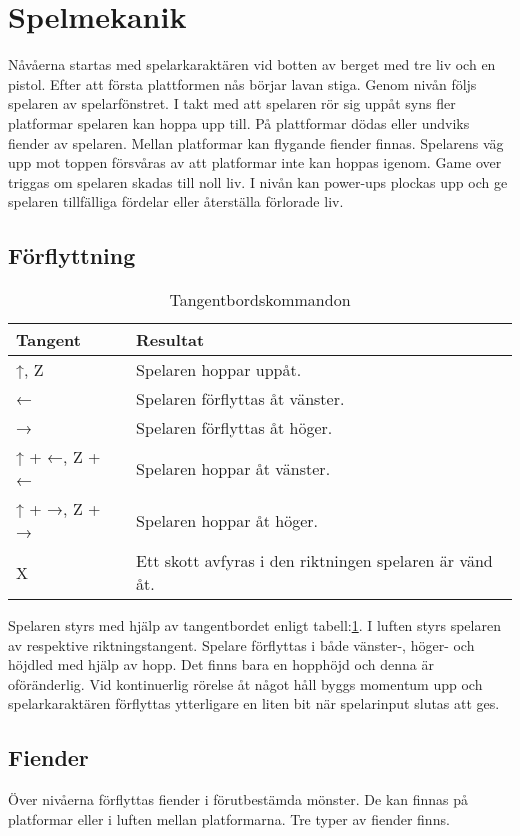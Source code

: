 \documentclass{TDP005mall}
\begin{document}
\section{Spelmekanik}%
Nåvåerna startas med spelarkaraktären vid botten av berget med tre liv och en pistol. Efter att första plattformen nås börjar lavan stiga. Genom nivån följs spelaren av spelarfönstret. I takt med att spelaren rör sig uppåt syns fler platformar spelaren kan hoppa upp till. På plattformar dödas eller undviks fiender av spelaren. Mellan platformar kan flygande fiender finnas. Spelarens väg upp mot toppen försvåras av att platformar inte kan hoppas igenom. Game over triggas om spelaren skadas till noll liv. I nivån kan power-ups plockas upp och ge spelaren tillfälliga fördelar eller återställa förlorade liv. 

\subsection{Förflyttning}

\begin{table}[h!]
  \centering
  \caption{Tangentbordskommandon\label{tab:1}}
\begin{tabular}{|l|l|}
\hline
Tangent & Resultat \\\hline
↑, Z & Spelaren hoppar uppåt. \\\hline
← & Spelaren förflyttas åt vänster. \\\hline
→ & Spelaren förflyttas åt höger. \\\hline
↑ + ←, Z + ← & Spelaren hoppar åt vänster. \\\hline
↑ + →, Z + → & Spelaren hoppar åt höger. \\\hline
X & Ett skott avfyras i den riktningen spelaren är vänd åt. \\\hline
\end{tabular}
\end{table}


Spelaren styrs med hjälp av tangentbordet enligt tabell:\ref{tab:1}. I luften styrs spelaren av respektive riktningstangent. Spelare förflyttas i både vänster-, höger- och höjdled med hjälp av hopp. Det finns bara en hopphöjd och denna är oföränderlig. Vid kontinuerlig rörelse åt något håll byggs momentum upp och spelarkaraktären förflyttas ytterligare en liten bit när spelarinput slutas att ges.

\subsection{Fiender}
Över nivåerna förflyttas fiender i förutbestämda mönster. De kan finnas på platformar eller i luften mellan platformarna. Tre typer av fiender finns.
\end{document}
